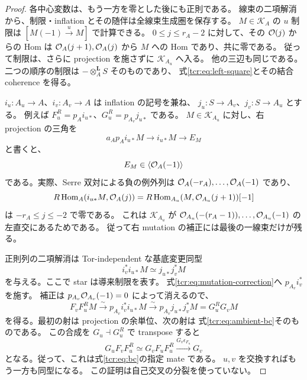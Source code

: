 \begin{proof}
各中心変数は、もう一方を零とした後にも正則である。
線束の二項解消から、制限・inflation とその随伴は全線束生成圏を保存する。
$M\in\mathcal K_A$ の $u$ 制限は $[M(-1)\xrightarrow{u}M]$ で計算できる。
$0\le j\le r_A-2$ に対して、その $\mathcal O(j)$ からの Hom は
$\mathcal O_A(j+1),\mathcal O_A(j)$ から $M$ への Hom であり、共に零である。
従って制限は、さらに projection を施さずに $\mathcal K_{A_u}$ へ入る。
他の三辺も同じである。
二つの順序の制限は $-\otimes_A^{\mathbf L}S$ そのものであり、
式\eqref{tcr:eq:left-square}とその結合 coherence を得る。

$i_u:A_u\to A$、$i_v:A_v\to A$ は inflation の記号を兼ね、
$j_u:S\to A_v$、$j_v:S\to A_u$ とする。
例えば $F_u^R=p_Ai_{u*}$、$G_u^R=p_{A_v}j_{u*}$ である。
$M\in\mathcal K_{A_u}$ に対し、右 projection の三角を
\begin{equation}\label{tcr:eq:mutation-correction}
     a_Ap_Ai_{u*}M\longrightarrow i_{u*}M\longrightarrow E_M
\end{equation}
と書くと、
\begin{equation}\label{tcr:eq:single-correction}
                         E_M\in\langle\mathcal O_A(-1)\rangle
\end{equation}
である。実際、Serre 双対による負の例外列は
$\mathcal O_A(-r_A),\ldots,\mathcal O_A(-1)$ であり、
\[
 R\operatorname{Hom}_A(i_{u*}M,\mathcal O_A(j))
   =R\operatorname{Hom}_{A_u}(M,\mathcal O_{A_u}(j+1))[-1]
\]
は $-r_A\le j\le-2$ で零である。
これは $\mathcal K_{A_u}$ が
$\mathcal O_{A_u}(-(r_A-1)),\ldots,\mathcal O_{A_u}(-1)$ の左直交にあるためである。
従って右 mutation の補正には最後の一線束だけが残る。

正則列の二項解消は Tor-independent な基底変更同型
\begin{equation}\label{tcr:eq:ambient-bc}
                i_v^*i_{u*}M\simeq j_{u*}j_v^*M
\end{equation}
を与える。ここで star は導来制限を表す。
式\eqref{tcr:eq:mutation-correction}へ $p_{A_v}i_v^*$ を施す。
補正は $p_{A_v}\mathcal O_{A_v}(-1)=0$ によって消えるので、
\[
 F_vF_u^RM
   \xrightarrow{\ \sim\ }p_{A_v}i_v^*i_{u*}M
   \xrightarrow{\ \sim\ }p_{A_v}j_{u*}j_v^*M
   =G_u^RG_vM
\]
を得る。最初の射は projection の余単位、次の射は
式\eqref{tcr:eq:ambient-bc}そのものである。
この合成を $G_u\dashv G_u^R$ で transpose すると
\[
 G_uF_vF_u^R\simeq G_vF_uF_u^R
                   \xrightarrow{G_v\epsilon_{F_u}}G_v
\]
となる。従って、これは式\eqref{tcr:eq:bc}の指定 mate である。
$u,v$ を交換すればもう一方も同型になる。
この証明は自己交叉の分裂を使っていない。
\end{proof}

